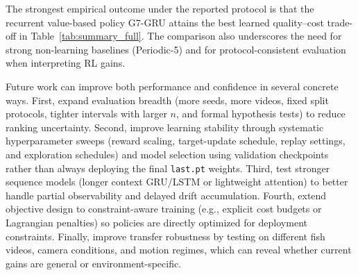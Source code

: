 \documentclass[letterpaper]{article}
\begin{document}
The strongest empirical outcome under the reported protocol is that the recurrent value-based policy G7-GRU attains the best learned quality--cost trade-off in Table~\ref{tab:summary_full}. The comparison also underscores the need for strong non-learning baselines (Periodic-5) and for protocol-consistent evaluation when interpreting RL gains.

Future work can improve both performance and confidence in several concrete ways. First, expand evaluation breadth (more seeds, more videos, fixed split protocols, tighter intervals with larger $n$, and formal hypothesis tests) to reduce ranking uncertainty. Second, improve learning stability through systematic hyperparameter sweeps (reward scaling, target-update schedule, replay settings, and exploration schedules) and model selection using validation checkpoints rather than always deploying the final \texttt{last.pt} weights. Third, test stronger sequence models (longer context GRU/LSTM or lightweight attention) to better handle partial observability and delayed drift accumulation. Fourth, extend objective design to constraint-aware training (e.g., explicit cost budgets or Lagrangian penalties) so policies are directly optimized for deployment constraints. Finally, improve transfer robustness by testing on different fish videos, camera conditions, and motion regimes, which can reveal whether current gains are general or environment-specific.
\end{document}
